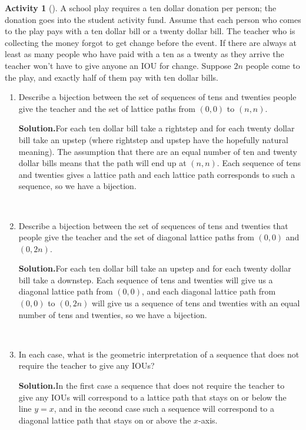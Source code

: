 \documentclass[10pt,]{book}
\theoremstyle{plain}
\theoremstyle{definition}
\newtheorem{activity}[project]{Activity}
\numberwithin{equation}{chapter}
\begin{document}
\begin{activity}[]\label{activity-50}
A school play requires a ten dollar donation per person; the donation goes into the student activity fund. Assume that each person who comes to the play pays with a ten dollar bill or a twenty dollar bill. The teacher who is collecting the money forgot to get change before the event. If there are always at least as many people who have paid with a ten as a twenty as they arrive the teacher won't have to give anyone an IOU for change. Suppose \(2n\) people come to the play, and exactly half of them pay with ten dollar bills.%
~\par
\begin{enumerate}[label=(\alph*)]
 \item Describe a bijection between the set of sequences of tens and twenties people give the teacher and the set of lattice paths from \((0,0)\) to \((n,n)\).%
\par\medskip\noindent%
\textbf{Solution.}\quad For each ten dollar bill take a rightstep and for each twenty dollar bill take an upstep (where rightstep and upstep have the hopefully natural meaning). The assumption that there are an equal number of ten and twenty dollar bills means that the path will end up at \((n,n)\). Each sequence of tens and twenties gives a lattice path and each lattice path corresponds to such a sequence, so we have a bijection.%

~\par
\item Describe a bijection between the set of sequences of tens and twenties that people give the teacher and the set of diagonal lattice paths from \((0,0)\) and \((0,2n)\).%
\par\medskip\noindent%
\textbf{Solution.}\quad For each ten dollar bill take an upstep and for each twenty dollar bill take a downstep. Each sequence of tens and twenties will give us a diagonal lattice path from \((0,0)\), and each diagonal lattice path from\((0,0)\) to \((0,2n)\) will give us a sequence of tens and twenties with an equal number of tens and twenties, so we have a bijection.%

~\par
\item In each case, what is the geometric interpretation of a sequence that does not require the teacher to give any IOUs?%
\par\medskip\noindent%
\textbf{Solution.}\quad In the first case a sequence that does not require the teacher to give any IOUs will correspond to a lattice path that stays on or below the line \(y=x\), and in the second case such a sequence will correspond to a diagonal lattice path that stays on or above the \(x\)-axis.%

\end{enumerate}
\end{activity}
\end{document}
